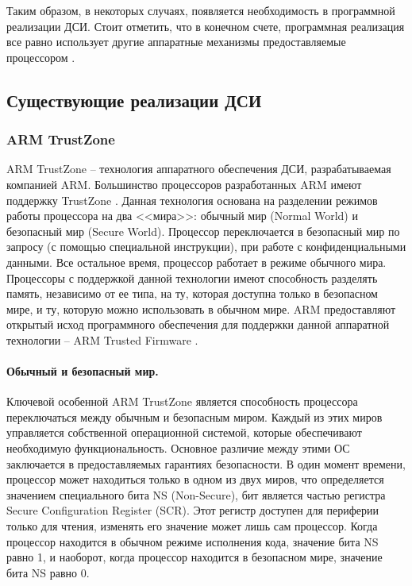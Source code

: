Таким образом, в некоторых случаях, появляется необходимость в программной реализации ДСИ. Стоит отметить, что в конечном счете, программная реализация все равно использует другие аппаратные механизмы предоставляемые процессором \cite{comparsion-arm-intel}.
 
\subsection{Существующие реализации ДСИ}

\subsubsection{ARM TrustZone}\label{arm-trustzone}

ARM TrustZone -- технология аппаратного обеспечения ДСИ, разрабатываемая компанией ARM. Большинство процессоров разработанных ARM имеют поддержку TrustZone \cite{comparsion-arm-intel}. Данная технология основана на разделении режимов работы процессора на два <<мира>>: обычный мир (Normal World) и безопасный мир (Secure World). Процессор переключается в безопасный мир по запросу (с помощью специальной инструкции), при работе с конфиденциальными данными. Все остальное время, процессор работает в режиме обычного мира. Процессоры с поддержкой данной технологии имеют способность разделять память, независимо от ее типа, на ту, которая доступна только в безопасном мире, и ту, которую можно использовать в обычном мире. ARM предоставляют открытый исход программного обеспечения для поддержки данной аппаратной технологии -- ARM Trusted Firmware \cite{arm-tfa}.

\paragraph{Обычный и безопасный мир.}

Ключевой особенной ARM TrustZone является способность процессора переключаться между обычным и безопасным миром. Каждый из этих миров управляется собственной операционной системой, которые обеспечивают необходимую функциональность. Основное различие между этими ОС заключается в предоставляемых гарантиях безопасности. В один момент времени, процессор может находиться только в одном из двух миров, что определяется значением специального бита NS (Non-Secure), бит является частью регистра Secure Configuration Register (SCR). Этот регистр доступен для периферии только для чтения, изменять его значение может лишь сам процессор. Когда процессор находится в обычном режиме исполнения кода, значение бита NS равно 1, и наоборот, когда процессор находится в безопасном мире, значение бита NS равно 0.

